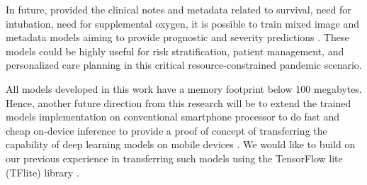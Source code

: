 In future, provided the clinical notes and metadata related to survival, need for intubation, need for supplemental oxygen, it is possible to train mixed image and metadata models aiming to provide prognostic and severity predictions \cite{cohen2020covid, wang2020covid}. These models could be highly useful for risk stratification, patient management, and personalized care planning in this critical resource-constrained pandemic scenario. 

 All models developed in this work have a memory footprint below 100 megabytes. Hence, another future direction from this research will be to extend the trained models implementation on conventional smartphone processor to do fast and cheap on-device inference to provide a proof of concept of transferring the capability of deep learning models on mobile devices  \cite{li2020covidmobilexpert}. We would like to build on our previous experience in transferring such models using the TensorFlow lite (TFlite) library \cite{tflite2019, zebin2019design}.












